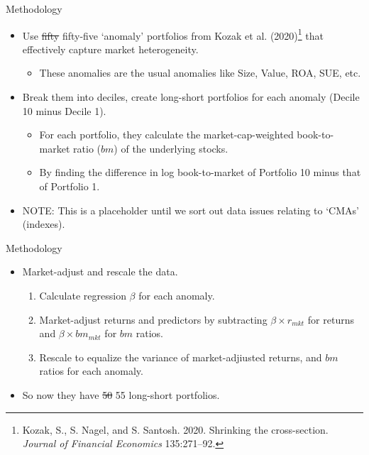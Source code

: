 \documentclass[dvipsnames,mathserif, handout]{beamer}
\begin{document}
{\begin{frame}{Methodology}
	\begin{itemize}
		\item Use \sout{fifty} fifty-five `anomaly' portfolios from Kozak et al. (2020)\footnote{\tiny Kozak, S., S. Nagel, and S. Santosh. 2020. Shrinking the cross-section. \textit{Journal of Financial Economics} 135:271–92.} that effectively capture market heterogeneity.
		\begin{itemize}
			\item These anomalies are the usual anomalies like Size, Value, ROA, SUE, etc.
		\end{itemize}
		\item Break them into deciles, create long-short portfolios for each anomaly (Decile 10 minus Decile 1).
		\begin{itemize}
			\item For each portfolio, they calculate the market-cap-weighted book-to-market ratio ($bm$) of the underlying stocks.
			\item By finding the difference in log book-to-market of Portfolio 10 minus that of Portfolio 1.
		\end{itemize}
		\item NOTE: This is a placeholder until we sort out data issues relating to `CMAs' (indexes).
	\end{itemize}
\end{frame}

\begin{frame}{Methodology}
	\begin{itemize}
		\item Market-adjust and rescale the data. 
		\begin{enumerate}
			\item Calculate regression $\beta$ for each anomaly. 
			\item Market-adjust returns and predictors by subtracting $\beta \times r_{mkt}$ for returns and $\beta \times bm_{mkt}$ for $bm$ ratios.
			\item Rescale to equalize the variance of market-adjiusted returns, and $bm$ ratios for each anomaly.
		\end{enumerate}
		\item So now they have \sout{50} 55 long-short portfolios.
	\end{itemize}
\end{frame}

}
\end{document}
